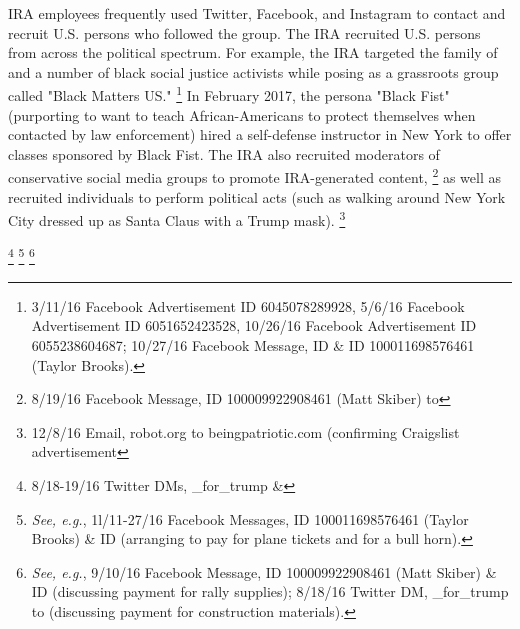 IRA employees frequently used  Twitter, Facebook, and Instagram to contact and recruit U.S. persons who followed the group.
The IRA recruited U.S. persons from across the political spectrum.
For example, the IRA targeted the family of  and a number of black social justice activists while posing as a grassroots group called "Black Matters US."%
\footnote{3/11/16 Facebook Advertisement ID 6045078289928, 5/6/16 Facebook Advertisement ID 6051652423528, 10/26/16 Facebook Advertisement ID 6055238604687;
10/27/16 Facebook Message, ID  \& ID 100011698576461 (Taylor Brooks).}
In February 2017, the persona "Black Fist" (purporting to want to teach African-Americans to protect themselves when contacted by law enforcement) hired a self-defense instructor in New York to offer classes sponsored by Black Fist.
The IRA also recruited moderators of conservative social media groups to promote IRA-generated content,%
\footnote{8/19/16 Facebook Message, ID 100009922908461 (Matt Skiber) to }
as well as recruited individuals to perform political acts (such as walking around New York City dressed up as Santa Claus with a Trump mask).%
\footnote{12/8/16 Email, robot\@craigslist.org to beingpatriotic\@gmail.com (confirming Craigslist advertisement}

\footnote{8/18-19/16 Twitter DMs, \@march\_for\_trump \& }
\footnote{\textit{See, e.g.}, 1l/11-27/16 Facebook Messages, ID 100011698576461 (Taylor Brooks) \& ID  (arranging to pay for plane tickets and for a bull horn).
}
\footnote{\textit{See, e.g.}, 9/10/16 Facebook Message, ID 100009922908461 (Matt Skiber) \& ID  (discussing payment for rally supplies);
8/18/16 Twitter DM, \@march\_for\_trump to  (discussing payment for construction materials).}

